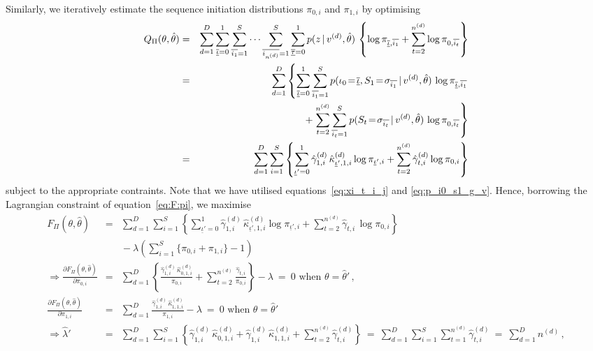 \documentclass[a4paper]{article}
\begin{document}
Similarly, we iteratively estimate the sequence initiation distributions $\pi_{0,i}$ and $\pi_{1,i}$ by optimising
\begin{eqnarray}
  Q_{\Pi}(\theta,\hat{\theta}) & = & 
\sum_{d=1}^D
\sum_{\overline{\underline{\iota}}=0}^{1}\sum_{\overline{i_1}=1}^{S}\cdots\sum_{\overline{i_{n^{(d)}}}=1}^{S}
\sum_{\overline{\underline{\tau}}=0}^{1}
p(z\,|\,v^{(d)},\hat{\theta})\,
\left\{\log\pi_{\overline{\underline{\iota}},\overline{i_1}}+\sum_{t=2}^{n^{(d)}}\log\pi_{0,\overline{i_{t}}}\right\}
\nonumber\\& = &
\sum_{d=1}^D\left\{
\sum_{\overline{\underline{\iota}}=0}^{1}\sum_{\overline{i_1}=1}^{S}
p(\iota_0\!=\!\overline{\underline{\iota}},S_1\!=\!\sigma_{\overline{i_1}}\,|\,v^{(d)},\hat{\theta})\,
\log\pi_{\overline{\underline{\iota}},\overline{i_1}}\right.
\nonumber\\&&\hspace*{10mm}
+\left.\sum_{t=2}^{n^{(d)}}\sum_{\overline{i_t}=1}^{S}
p(S_t\!=\!\sigma_{\overline{i_t}}\,|\,v^{(d)},\hat{\theta})\,
\log\pi_{0,\overline{i_t}}\right\}
\nonumber\\& = &
\sum_{d=1}^D\sum_{i=1}^{S}\left\{
\sum_{\underline{\iota}'=0}^{1}
\hat{\gamma}^{(d)}_{1,i}\,\hat{\kappa}_{\underline{\iota}',1,i}^{(d)}\log\pi_{\underline{\iota}',i}
+\sum_{t=2}^{n^{(d)}}
\hat{\gamma}_{t,i}^{(d)}\log\pi_{0,i}\right\}
\end{eqnarray}
subject to the appropriate contraints. Note that we have utilised equations~\eqref{eq:xi_t_i_j} and \eqref{eq:p_i0_s1_g_v}.
Hence, borrowing the Lagrangian constraint of equation~\eqref{eq:F:pi}, we maximise
\begin{eqnarray}
  F_{\Pi}(\theta,\hat{\theta}) & = & 
\sum_{d=1}^D\sum_{i=1}^{S}\left\{
\sum_{\underline{\iota}'=0}^{1}
\hat{\gamma}^{(d)}_{1,i}\,\hat{\kappa}^{(d)}_{\underline{\iota}',1,i}
\log\pi_{\underline{\iota}',i}
+\sum_{t=2}^{n^{(d)}}
\hat{\gamma}_{t,i}\,\log\pi_{0,i}\right\}
\nonumber\\&&
{}-\lambda\left(\sum_{i=1}^{S}\{\pi_{0,i}+\pi_{1,i}\}-1\right)
\\
\Rightarrow\frac{\partial F_{\Pi}(\theta,\hat{\theta})}{\partial\pi_{0,i}}
& = &
\sum_{d=1}^D\left\{\frac{\hat{\gamma}^{(d)}_{1,i}\,\hat{\kappa}^{(d)}_{0,1,i}}{\pi_{0,i}}+\sum_{t=2}^{n^{(d)}}\frac{\hat{\gamma}_{t,i}}{\pi_{0,i}}\right\}-\lambda
~=~0\mbox{ when }\theta=\hat{\theta}'\,,
\nonumber\\
\frac{\partial F_{\Pi}(\theta,\hat{\theta})}{\partial\pi_{1,i}}
& = &
\sum_{d=1}^D\frac{\hat{\gamma}^{(d)}_{1,i}\,\hat{\kappa}^{(d)}_{1,1,i}}{\pi_{1,i}}-\lambda
~=~0\mbox{ when }\theta=\hat{\theta}'
\nonumber\\
\Rightarrow\hat{\lambda}' & = & \sum_{d=1}^D
\sum_{i=1}^{S}\left\{\hat{\gamma}^{(d)}_{1,i}\,\hat{\kappa}^{(d)}_{0,1,i}
+\hat{\gamma}^{(d)}_{1,i}\,\hat{\kappa}^{(d)}_{1,1,i}+\sum_{t=2}^{n^{(d)}}\hat{\gamma}^{(d)}_{t,i}\right\}
~=~\sum_{d=1}^D\sum_{i=1}^{S}\sum_{t=1}^{n^{(d)}}\hat{\gamma}^{(d)}_{t,i}~=~\sum_{d=1}^D n^{(d)}\,,
\end{eqnarray}
\end{document}
